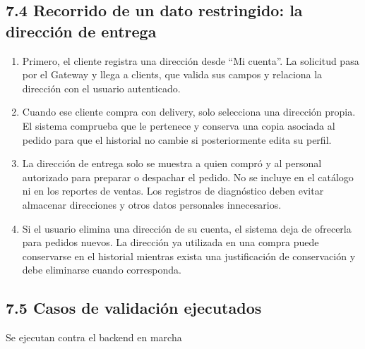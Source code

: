 \documentclass[10pt,letterpaper]{article}
\begin{document}
\subsection*{7.4 Recorrido de un dato restringido: la dirección de entrega}
\begin{enumerate}
\item Primero, el cliente registra una dirección desde “Mi cuenta”. La solicitud pasa por el Gateway y llega a clients, que valida sus campos y relaciona la dirección con el usuario autenticado.
\item Cuando ese cliente compra con delivery, solo selecciona una dirección propia. El sistema comprueba que le pertenece y conserva una copia asociada al pedido para que el historial no cambie si posteriormente edita su perfil.
\item La dirección de entrega solo se muestra a quien compró y al personal autorizado para preparar o despachar el pedido. No se incluye en el catálogo ni en los reportes de ventas. Los registros de diagnóstico deben evitar almacenar direcciones y otros datos personales innecesarios.
\item Si el usuario elimina una dirección de su cuenta, el sistema deja de ofrecerla para pedidos nuevos. La dirección ya utilizada en una compra puede conservarse en el historial mientras exista una justificación de conservación y debe eliminarse cuando corresponda.
\end{enumerate}

\subsection*{7.5 Casos de validación ejecutados}
Se ejecutan contra el backend en marcha
\end{document}
